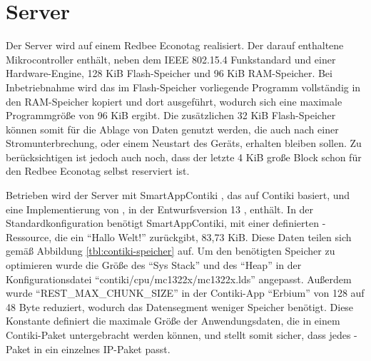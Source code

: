 \section{Server}
\label{sec:server}

Der Server wird auf einem Redbee Econotag \cite{econotag} realisiert. Der darauf enthaltene Mikrocontroller  \cite{mc1322} enthält,
neben dem IEEE 802.15.4 Funkstandard und einer  Hardware-Engine, 128 KiB Flash-Speicher und 96 KiB RAM-Speicher. Bei Inbetriebnahme
wird das im Flash-Speicher vorliegende Programm vollständig in den RAM-Speicher kopiert und dort ausgeführt, wodurch sich eine maximale
Programmgröße von 96 KiB ergibt. Die zusätzlichen 32 KiB Flash-Speicher können somit für die Ablage von Daten genutzt werden, die auch nach einer
Stromunterbrechung, oder einem Neustart des Geräts, erhalten bleiben sollen. Zu berücksichtigen ist jedoch auch noch, dass der letzte 4 KiB große
Block schon für den Redbee Econotag selbst reserviert ist.

Betrieben wird der Server mit SmartAppContiki \cite{erbium}, das auf Contiki \cite{contiki} basiert, und eine Implementierung von , in
der Entwurfsversion 13 \cite{draftcoap13}, enthält. In der Standardkonfiguration benötigt SmartAppContiki, mit einer definierten -Ressource,
die ein "`Hallo Welt!"' zurückgibt, 83,73 KiB. Diese Daten teilen sich gemäß Abbildung \ref{tbl:contiki-speicher} auf. Um den benötigten
Speicher zu optimieren wurde die Größe des "`Sys Stack"' und des "`Heap"' in der Konfigurationsdatei "`contiki/cpu/mc1322x/mc1322x.lds"' angepasst.
Außerdem wurde "`REST\_MAX\_CHUNK\_SIZE"' in der Contiki-App "`Erbium"' von 128 auf 48 Byte reduziert, wodurch das Datensegment weniger Speicher benötigt.
Diese Konstante definiert die maximale Größe der Anwendungsdaten, die in einem Contiki-Paket untergebracht werden können, und stellt somit sicher,
dass jedes -Paket in ein einzelnes IP-Paket passt.

